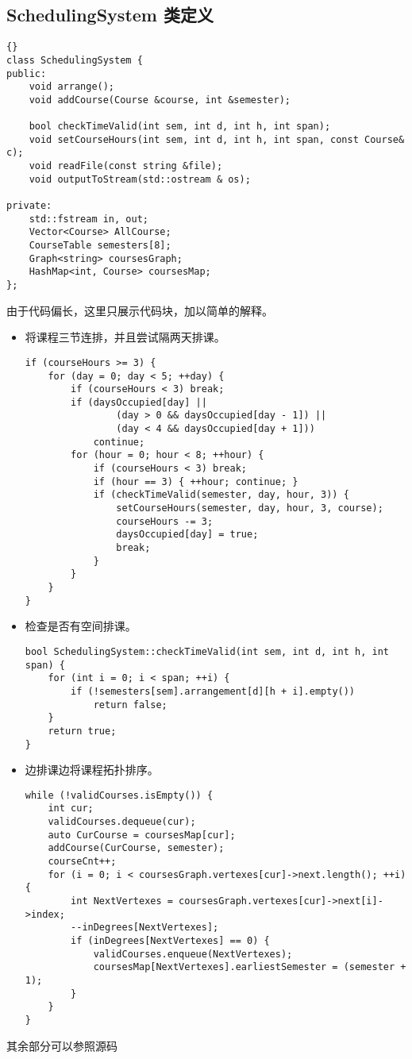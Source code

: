 \subsection{SchedulingSystem 类定义}
\begin{lstlisting}[firstnumber=939, caption=SchedulingSystem 类定义]{}
class SchedulingSystem {
public:
    void arrange();
    void addCourse(Course &course, int &semester);

    bool checkTimeValid(int sem, int d, int h, int span);
    void setCourseHours(int sem, int d, int h, int span, const Course& c);
    void readFile(const string &file);
    void outputToStream(std::ostream & os);

private:
    std::fstream in, out;
    Vector<Course> AllCourse;
    CourseTable semesters[8];
    Graph<string> coursesGraph;
    HashMap<int, Course> coursesMap;
};
\end{lstlisting}

由于代码偏长，这里只展示代码块，加以简单的解释。

\begin{itemize}
    \item 将课程三节连排，并且尝试隔两天排课。
\begin{lstlisting}[firstnumber=1028]
if (courseHours >= 3) {
    for (day = 0; day < 5; ++day) {
        if (courseHours < 3) break;
        if (daysOccupied[day] ||
                (day > 0 && daysOccupied[day - 1]) ||
                (day < 4 && daysOccupied[day + 1]))
            continue;
        for (hour = 0; hour < 8; ++hour) {
            if (courseHours < 3) break;
            if (hour == 3) { ++hour; continue; }
            if (checkTimeValid(semester, day, hour, 3)) {
                setCourseHours(semester, day, hour, 3, course);
                courseHours -= 3;
                daysOccupied[day] = true;
                break;
            }
        }
    }
}
\end{lstlisting}   
    \item 检查是否有空间排课。
\begin{lstlisting}[firstnumber=1129]
bool SchedulingSystem::checkTimeValid(int sem, int d, int h, int span) {
    for (int i = 0; i < span; ++i) {
        if (!semesters[sem].arrangement[d][h + i].empty())
            return false;
    }
    return true;
}
\end{lstlisting}  
    \item 边排课边将课程拓扑排序。
\begin{lstlisting}[firstnumber=975]
while (!validCourses.isEmpty()) {
    int cur;
    validCourses.dequeue(cur);
    auto CurCourse = coursesMap[cur];
    addCourse(CurCourse, semester);
    courseCnt++;
    for (i = 0; i < coursesGraph.vertexes[cur]->next.length(); ++i) {
        int NextVertexes = coursesGraph.vertexes[cur]->next[i]->index;
        --inDegrees[NextVertexes];
        if (inDegrees[NextVertexes] == 0) {
            validCourses.enqueue(NextVertexes);
            coursesMap[NextVertexes].earliestSemester = (semester + 1);
        }
    }
}
\end{lstlisting}  
\end{itemize}

其余部分可以参照源码